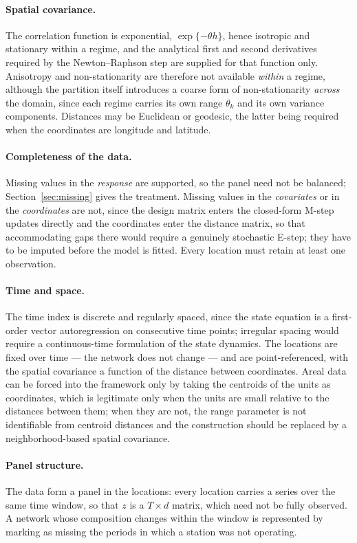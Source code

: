 \paragraph{Spatial covariance.} The correlation function is exponential, $\exp\{-\theta h\}$, hence isotropic and stationary within a regime, and the analytical first and second derivatives required by the Newton--Raphson step are supplied for that function only. Anisotropy and non-stationarity are therefore not available \emph{within} a regime, although the partition itself introduces a coarse form of non-stationarity \emph{across} the domain, since each regime carries its own range $\theta_k$ and its own variance components. Distances may be Euclidean or geodesic, the latter being required when the coordinates are longitude and latitude.

\paragraph{Completeness of the data.} Missing values in the \emph{response} are supported, so the panel need not be balanced; Section~\ref{sec:missing} gives the treatment. Missing values in the \emph{covariates} or in the \emph{coordinates} are not, since the design matrix enters the closed-form M-step updates directly and the coordinates enter the distance matrix, so that accommodating gaps there would require a genuinely stochastic E-step; they have to be imputed before the model is fitted. Every location must retain at least one observation.

\paragraph{Time and space.} The time index is discrete and regularly spaced, since the state equation is a first-order vector autoregression on consecutive time points; irregular spacing would require a continuous-time formulation of the state dynamics. The locations are fixed over time --- the network does not change --- and are point-referenced, with the spatial covariance a function of the distance between coordinates. Areal data can be forced into the framework only by taking the centroids of the units as coordinates, which is legitimate only when the units are small relative to the distances between them; when they are not, the range parameter is not identifiable from centroid distances and the construction should be replaced by a neighborhood-based spatial covariance.

\paragraph{Panel structure.} The data form a panel in the locations: every location carries a series over the same time window, so that $z$ is a $T \times d$ matrix, which need not be fully observed. A network whose composition changes within the window is represented by marking as missing the periods in which a station was not operating.

